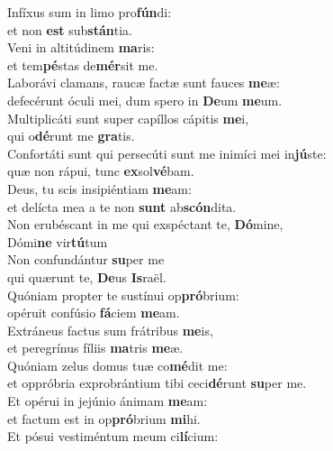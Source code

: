 \evenverse Infíxus sum in limo pro\textbf{fún}di:~\*\\
\evenverse et non \textbf{est} sub\textbf{stán}tia.\\
\oddverse Veni in altitúdinem \textbf{ma}ris:~\*\\
\oddverse et tem\textbf{pé}stas de\textbf{mér}sit me.\\
\evenverse Laborávi clamans, raucæ factæ sunt fauces \textbf{me}æ:~\*\\
\evenverse defecérunt óculi mei, dum spero in \textbf{De}um \textbf{me}um.\\
\oddverse Multiplicáti sunt super capíllos cápitis \textbf{me}i,~\*\\
\oddverse qui o\textbf{dé}runt me \textbf{gra}tis.\\
\evenverse Confortáti sunt qui persecúti sunt me inimíci mei in\textbf{jú}ste:~\*\\
\evenverse quæ non rápui, tunc \textbf{ex}sol\textbf{vé}bam.\\
\oddverse Deus, tu scis insipiéntiam \textbf{me}am:~\*\\
\oddverse et delícta mea a te non \textbf{sunt} ab\textbf{scón}dita.\\
\evenverse Non erubéscant in me qui exspéctant te, \textbf{Dó}mine,~\*\\
\evenverse Dómi\textbf{ne} vir\textbf{tú}tum\\
\oddverse Non confundántur \textbf{su}per me~\*\\
\oddverse qui quærunt te, \textbf{De}us \textbf{Is}raël.\\
\evenverse Quóniam propter te sustínui op\textbf{pró}brium:~\*\\
\evenverse opéruit confúsio \textbf{fá}ciem \textbf{me}am.\\
\oddverse Extráneus factus sum frátribus \textbf{me}is,~\*\\
\oddverse et peregrínus fíliis \textbf{ma}tris \textbf{me}æ.\\
\evenverse Quóniam zelus domus tuæ co\textbf{mé}dit me:~\*\\
\evenverse et oppróbria exprobrántium tibi ceci\textbf{dé}runt \textbf{su}per me.\\
\oddverse Et opérui in jejúnio ánimam \textbf{me}am:~\*\\
\oddverse et factum est in op\textbf{pró}brium \textbf{mi}hi.\\
\evenverse Et pósui vestiméntum meum ci\textbf{lí}cium:~\*\\
